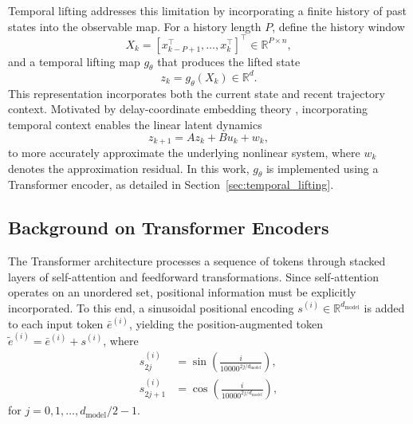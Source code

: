 \documentclass[journal]{IEEEtran}
\begin{document}
Temporal lifting addresses this limitation by incorporating a finite history of past states into the observable map. For a history length $P$, define the history window
\begin{equation}
    X_k = [x_{k-P+1}^\top, \ldots, x_k^\top]^\top \in \mathbb{R}^{P\times n},
    \label{eq:history_window}
\end{equation}
and a temporal lifting map $g_\theta$ that produces the lifted state
\begin{equation}
    z_k = g_\theta(X_k) \in \mathbb{R}^d.
    \label{eq:temporal_lifting}
\end{equation}
This representation incorporates both the current state and recent trajectory context. Motivated by delay-coordinate embedding theory \cite{arbabi2017ergodic, rank2019recurrent}, incorporating temporal context enables the linear latent dynamics
\begin{equation}
    z_{k+1} = A z_k + B u_k + w_k,
    \label{eq:lifted_dynamics_prelim}
\end{equation}
to more accurately approximate the underlying nonlinear system, where $w_k$ denotes the approximation residual. In this work, $g_\theta$ is implemented using a Transformer encoder, as detailed in Section~\ref{sec:temporal_lifting}.

\subsection{Background on Transformer Encoders}
\label{sec:transformer_background}

The Transformer architecture \cite{vaswani2017attention} processes a sequence of tokens through stacked layers of self-attention and feedforward transformations. Since self-attention operates on an unordered set, positional information must be explicitly incorporated. To this end, a sinusoidal positional encoding $s^{(i)} \in \mathbb{R}^{d_{\mathrm{model}}}$ is added to each input token $\bar{e}^{(i)}$, yielding the position-augmented token $\tilde{e}^{(i)} = \bar{e}^{(i)} + s^{(i)}$, where
\begin{equation}
\begin{split}
    s^{(i)}_{2j} &= \sin\!\left(\frac{i}{10000^{2j/d_{\mathrm{model}}}}\right), \\
    s^{(i)}_{2j+1} &= \cos\!\left(\frac{i}{10000^{2j/d_{\mathrm{model}}}}\right),
\end{split}
\label{eq:pos_enc}
\end{equation}
for $j = 0, 1, \ldots, d_{\mathrm{model}}/2 - 1$.
\end{document}
